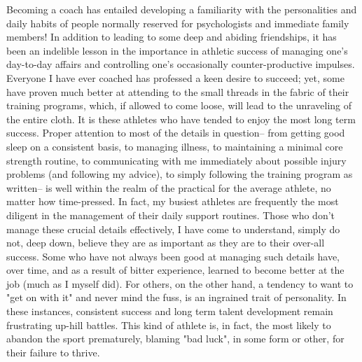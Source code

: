 Becoming a coach has entailed developing a familiarity with the personalities and daily habits of people normally reserved for psychologists and immediate family members! In addition to leading to some deep and abiding friendships, it has been an indelible lesson in the importance in athletic success of managing one's day-to-day affairs and controlling one's occasionally counter-productive impulses. Everyone I have ever coached has professed a keen desire to succeed; yet, some have proven much better at attending to the small threads in the fabric of their training programs, which, if allowed to come loose, will lead to the unraveling of the entire cloth. It is these athletes who have tended to enjoy the most long term success. Proper attention to most of the details in question-- from getting good sleep on a consistent basis, to managing illness, to maintaining a minimal core strength routine, to communicating with me immediately about possible injury problems (and following my advice), to simply following the training program as written-- is well within the realm of the practical for the average athlete, no matter how time-pressed. In fact, my busiest athletes are frequently the most diligent in the management of their daily support routines. Those who don't manage these crucial details effectively, I have come to understand, simply do not, deep down, believe they are as important as they are to their over-all success. Some who have not always been good at managing such details have, over time, and as a result of bitter experience, learned to become better at the job (much as I myself did). For others, on the other hand, a tendency to want to "get on with it" and never mind the fuss, is an ingrained trait of personality. In these instances, consistent success and long term talent development remain frustrating up-hill battles. This kind of athlete is, in fact, the most likely to abandon the sport prematurely, blaming "bad luck", in some form or other, for their failure to thrive.

